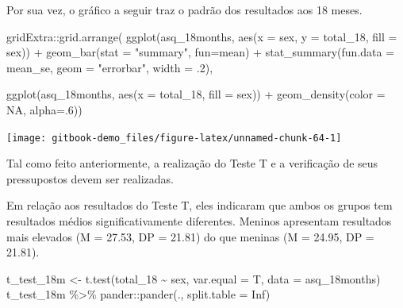 \documentclass[
]{book}
\newenvironment{Shaded}{\begin{snugshade}}{\end{snugshade}}
\newcommand{\AttributeTok}[1]{\textcolor[rgb]{0.77,0.63,0.00}{#1}}
\newcommand{\ConstantTok}[1]{\textcolor[rgb]{0.00,0.00,0.00}{#1}}
\newcommand{\DecValTok}[1]{\textcolor[rgb]{0.00,0.00,0.81}{#1}}
\newcommand{\FunctionTok}[1]{\textcolor[rgb]{0.00,0.00,0.00}{#1}}
\newcommand{\NormalTok}[1]{#1}
\newcommand{\OtherTok}[1]{\textcolor[rgb]{0.56,0.35,0.01}{#1}}
\newcommand{\SpecialCharTok}[1]{\textcolor[rgb]{0.00,0.00,0.00}{#1}}
\newcommand{\StringTok}[1]{\textcolor[rgb]{0.31,0.60,0.02}{#1}}
\begin{document}
Por sua vez, o gráfico a seguir traz o padrão dos resultados aos 18 meses.

\begin{Shaded}
\begin{Highlighting}[]
\NormalTok{gridExtra}\SpecialCharTok{::}\FunctionTok{grid.arrange}\NormalTok{(}
  \FunctionTok{ggplot}\NormalTok{(asq\_18months, }\FunctionTok{aes}\NormalTok{(}\AttributeTok{x =}\NormalTok{ sex, }\AttributeTok{y =}\NormalTok{ total\_18, }\AttributeTok{fill =}\NormalTok{ sex)) }\SpecialCharTok{+}
  \FunctionTok{geom\_bar}\NormalTok{(}\AttributeTok{stat =} \StringTok{"summary"}\NormalTok{, }\AttributeTok{fun=}\NormalTok{mean) }\SpecialCharTok{+}
  \FunctionTok{stat\_summary}\NormalTok{(}\AttributeTok{fun.data =}\NormalTok{ mean\_se, }\AttributeTok{geom =} \StringTok{"errorbar"}\NormalTok{, }\AttributeTok{width =}\NormalTok{ .}\DecValTok{2}\NormalTok{),}

  \FunctionTok{ggplot}\NormalTok{(asq\_18months, }\FunctionTok{aes}\NormalTok{(}\AttributeTok{x =}\NormalTok{ total\_18, }\AttributeTok{fill =}\NormalTok{ sex)) }\SpecialCharTok{+} 
  \FunctionTok{geom\_density}\NormalTok{(}\AttributeTok{color =} \ConstantTok{NA}\NormalTok{, }\AttributeTok{alpha=}\NormalTok{.}\DecValTok{6}\NormalTok{))}
\end{Highlighting}
\end{Shaded}

\begin{center}\texttt{[image: gitbook-demo\_files/figure-latex/unnamed-chunk-64-1]} \end{center}

Tal como feito anteriormente, a realização do Teste T e a verificação de seus pressupostos devem ser realizadas.

Em relação aos resultados do Teste T, eles indicaram que ambos os grupos tem resultados médios significativamente diferentes. Meninos apresentam resultados mais elevados (M = 27.53, DP = 21.81) do que meninas (M = 24.95, DP = 21.81).

\begin{Shaded}
\begin{Highlighting}[]
\NormalTok{t\_test\_18m }\OtherTok{\textless{}{-}} \FunctionTok{t.test}\NormalTok{(total\_18 }\SpecialCharTok{\textasciitilde{}}\NormalTok{ sex, }\AttributeTok{var.equal =}\NormalTok{ T,}
                     \AttributeTok{data =}\NormalTok{ asq\_18months)}
\NormalTok{t\_test\_18m }\SpecialCharTok{\%\textgreater{}\%}\NormalTok{ pander}\SpecialCharTok{::}\FunctionTok{pander}\NormalTok{(., }\AttributeTok{split.table =} \ConstantTok{Inf}\NormalTok{)}
\end{Highlighting}
\end{Shaded}
\end{document}
